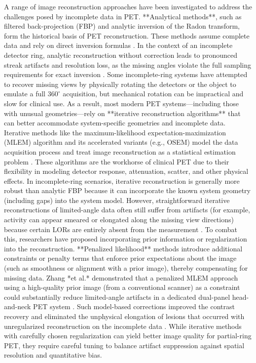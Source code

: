 \documentclass[
reprint,
superscriptaddress,
nofootinbib,
amsmath,amssymb,
aps,
prd,
]{revtex4-2}
\begin{document}
A range of image reconstruction approaches have been investigated to address the challenges posed by incomplete data in PET. **Analytical methods**, such as filtered back-projection (FBP) and analytic inversion of the Radon transform, form the historical basis of PET reconstruction. These methods assume complete data and rely on direct inversion formulas \cite{kak1988}. In the context of an incomplete detector ring, analytic reconstruction without correction leads to pronounced streak artifacts and resolution loss, as the missing angles violate the full sampling requirements for exact inversion \cite{kak1988}. Some incomplete-ring systems have attempted to recover missing views by physically rotating the detectors or the object to emulate a full $360^\circ$ acquisition, but mechanical rotation can be impractical and slow for clinical use. As a result, most modern PET systems—including those with unusual geometries—rely on **iterative reconstruction algorithms** that can better accommodate system-specific geometries and incomplete data. Iterative methods like the maximum-likelihood expectation-maximization (MLEM) algorithm and its accelerated variants (e.g., OSEM) model the data acquisition process and treat image reconstruction as a statistical estimation problem \cite{qi2006}. These algorithms are the workhorse of clinical PET due to their flexibility in modeling detector response, attenuation, scatter, and other physical effects. In incomplete-ring scenarios, iterative reconstruction is generally more robust than analytic FBP because it can incorporate the known system geometry (including gaps) into the system model. However, straightforward iterative reconstructions of limited-angle data often still suffer from artifacts (for example, activity can appear smeared or elongated along the missing view directions) because certain LORs are entirely absent from the measurement \cite{zhang2020}. To combat this, researchers have proposed incorporating prior information or regularization into the reconstruction. **Penalized likelihood** methods introduce additional constraints or penalty terms that enforce prior expectations about the image (such as smoothness or alignment with a prior image), thereby compensating for missing data. Zhang *et al.* demonstrated that a penalized MLEM approach using a high-quality prior image (from a conventional scanner) as a constraint could substantially reduce limited-angle artifacts in a dedicated dual-panel head-and-neck PET system \cite{zhang2020}. Such model-based corrections improved the contrast recovery and eliminated the unphysical elongation of lesions that occurred with unregularized reconstruction on the incomplete data \cite{zhang2020}. While iterative methods with carefully chosen regularization can yield better image quality for partial-ring PET, they require careful tuning to balance artifact suppression against spatial resolution and quantitative bias.
\end{document}
